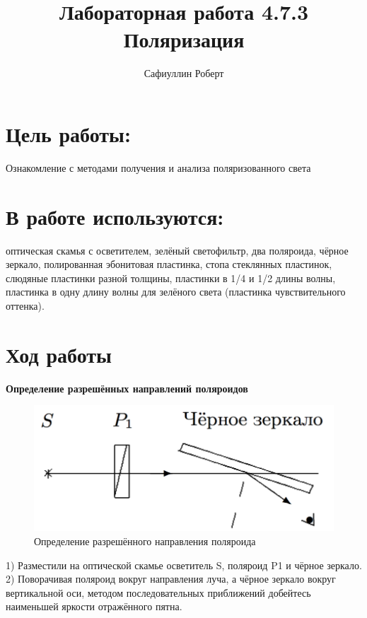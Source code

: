 \documentclass[a4paper,12pt]{article} %
\author{Сафиуллин Роберт	}
\title{Лабораторная работа  4.7.3\\ Поляризация}
\begin{document}

\maketitle


\newpage

\section{Цель работы:}
  Ознакомление с методами получения и анализа поляризованного света
\\
\section{В работе используются:}
оптическая скамья с осветителем, зелёный светофильтр, два поляроида, чёрное зеркало, полированная эбонитовая пластинка, стопа стеклянных пластинок, слюдяные пластинки разной толщины, пластинки в 1/4 и 1/2 длины волны, пластинка в одну длину волны для зелёного света (пластинка чувствительного оттенка).


 
        


\section{Ход работы}

\textbf{Определение разрешённых направлений поляроидов}
\begin{figure}[H]
	\centering
	\includegraphics[width = 12 cm]{1.png}
	\caption{Определение разрешённого направления поляроида}
\end{figure}
 1) Разместили на оптической скамье осветитель S, поляроид P1 и чёрное зеркало.\\
 
 2) Поворачивая поляроид вокруг направления луча, а чёрное зеркало вокруг вертикальной оси, методом последовательных приближений добейтесь наименьшей яркости отражённого пятна.\\
 
\end{document}
